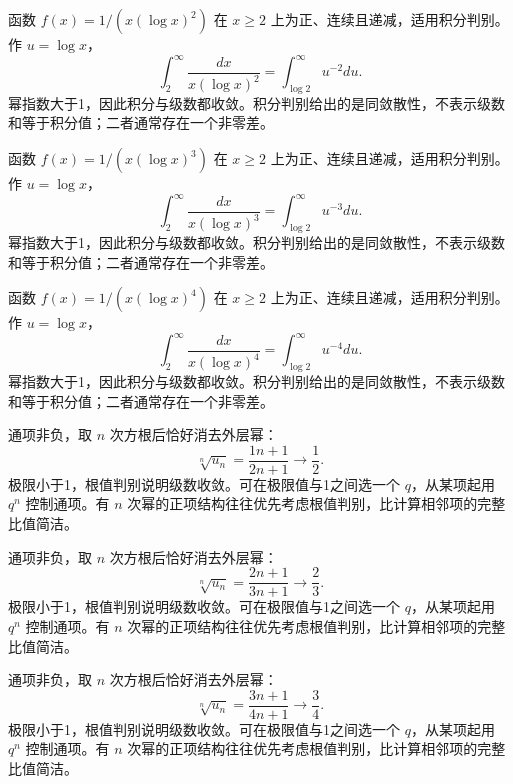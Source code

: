 \documentclass[UTF8,12pt,a4paper,fontset=fandol]{ctexart}
\begin{document}
\begin{solve}\label{ans:c25q4}
函数 $f(x)=1/(x(\log x)^{2})$ 在 $x\ge2$ 上为正、连续且递减，适用积分判别。作 $u=\log x$，
\[
\int_2^\infty\frac{dx}{x(\log x)^{2}}=\int_{\log2}^\infty u^{-2}du.
\]
幂指数大于1，因此积分与级数都收敛。积分判别给出的是同敛散性，不表示级数和等于积分值；二者通常存在一个非零差。
\end{solve}

\begin{solve}\label{ans:c25q5}
函数 $f(x)=1/(x(\log x)^{3})$ 在 $x\ge2$ 上为正、连续且递减，适用积分判别。作 $u=\log x$，
\[
\int_2^\infty\frac{dx}{x(\log x)^{3}}=\int_{\log2}^\infty u^{-3}du.
\]
幂指数大于1，因此积分与级数都收敛。积分判别给出的是同敛散性，不表示级数和等于积分值；二者通常存在一个非零差。
\end{solve}

\begin{solve}\label{ans:c25q6}
函数 $f(x)=1/(x(\log x)^{4})$ 在 $x\ge2$ 上为正、连续且递减，适用积分判别。作 $u=\log x$，
\[
\int_2^\infty\frac{dx}{x(\log x)^{4}}=\int_{\log2}^\infty u^{-4}du.
\]
幂指数大于1，因此积分与级数都收敛。积分判别给出的是同敛散性，不表示级数和等于积分值；二者通常存在一个非零差。
\end{solve}

\begin{solve}\label{ans:c25q7}
通项非负，取 $n$ 次方根后恰好消去外层幂：
\[
\sqrt[n]{u_n}=\frac{1n+1}{2n+1}\longrightarrow \frac{1}{2}.
\]
极限小于1，根值判别说明级数收敛。可在极限值与1之间选一个 $q$，从某项起用 $q^n$ 控制通项。有 $n$ 次幂的正项结构往往优先考虑根值判别，比计算相邻项的完整比值简洁。
\end{solve}

\begin{solve}\label{ans:c25q8}
通项非负，取 $n$ 次方根后恰好消去外层幂：
\[
\sqrt[n]{u_n}=\frac{2n+1}{3n+1}\longrightarrow \frac{2}{3}.
\]
极限小于1，根值判别说明级数收敛。可在极限值与1之间选一个 $q$，从某项起用 $q^n$ 控制通项。有 $n$ 次幂的正项结构往往优先考虑根值判别，比计算相邻项的完整比值简洁。
\end{solve}

\begin{solve}\label{ans:c25q9}
通项非负，取 $n$ 次方根后恰好消去外层幂：
\[
\sqrt[n]{u_n}=\frac{3n+1}{4n+1}\longrightarrow \frac{3}{4}.
\]
极限小于1，根值判别说明级数收敛。可在极限值与1之间选一个 $q$，从某项起用 $q^n$ 控制通项。有 $n$ 次幂的正项结构往往优先考虑根值判别，比计算相邻项的完整比值简洁。
\end{solve}
\end{document}
